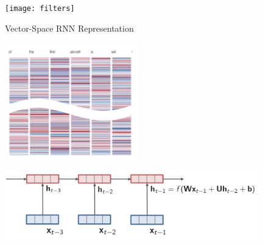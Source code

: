 \documentclass{beamer}
\newcommand{\air}{\vspace{0.25cm}}
\newcommand{\Cite}[1]{{\footnotesize \citep{#1}}}
\begin{document}




\begin{frame}
  \air 
  \texttt{[image: filters]}
  \begin{center}
     \Cite{DBLP:conf/eccv/ZeilerF14}
  \end{center}
\end{frame}


\begin{frame}
  \centerline{Vector-Space RNN Representation}
  \begin{center}
    \includegraphics[height=5cm]{lstmrep}
  \begin{center}
    \includegraphics[width=11cm]{rnn}
  \end{center}
  \end{center}
\end{frame}
\end{document}
